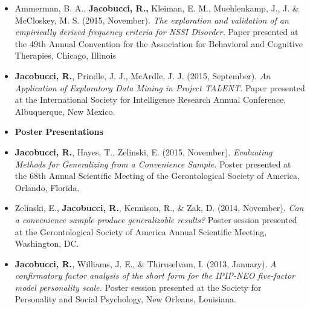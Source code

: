 \documentclass[letterpaper,10pt]{article}
\begin{document}
\begin{itemize}
\item[]Ammerman, B. A., \textbf{Jacobucci, R.,} Kleiman, E. M., Muehlenkamp, J., J. \& McCloskey, M. S. (2015, November). \emph{The exploration and validation of an empirically derived frequency criteria for NSSI Disorder.} Paper presented at the 49th Annual Convention for the Association for Behavioral and Cognitive Therapies, Chicago, Illinois
%
\item[] \textbf{Jacobucci, R.}, Prindle, J. J., McArdle, J. J. (2015, September). \emph{An Application of Exploratory Data Mining in Project TALENT.} Paper presented at the International Society for Intelligence Research Annual Conference, Albuquerque, New Mexico.
%
%
%
%
%
%
\item[]{\textbf{\large{Poster Presentations}}}
%
\item[] \textbf{Jacobucci, R.}, Hayes, T., Zelinski, E. (2015, November). \emph{Evaluating Methods for Generalizing from a Convenience Sample.} Poster presented at the 68th Annual Scientific Meeting of the Gerontological Society of America, Orlando, Florida.
%
\item[]Zelinski, E., \textbf{Jacobucci, R.}, Kennison, R., \& Zak, D. (2014, November). \emph{Can a convenience sample produce generalizable results?} Poster session presented at the Gerontological Society of America Annual Scientific Meeting, Washington, DC.
%
\item[]\textbf{Jacobucci, R.}, Williams, J. E., \& Thiruselvam, I. (2013, January). \emph{A confirmatory factor analysis of the short form for the IPIP-NEO five-factor model personality scale.} Poster session presented at the Society for Personality and Social Psychology, New Orleans, Louisiana.

\end{itemize}
\end{document}
